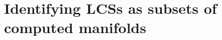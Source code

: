 \section{Identifying LCSs as subsets of computed manifolds}
\label{sec:identifying_lcss_as_subsets_of_computed_manifolds}



